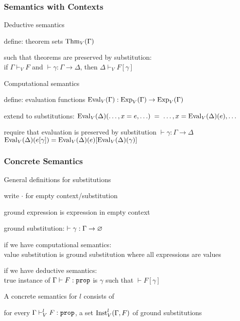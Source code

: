 \begin{frame}\frametitle{Semantics with Contexts}
\begin{blockitems}{Deductive semantics}
\item define: theorem sets $\mathrm{Thm}_V(\Gamma)$
\item such that theorems are preserved by substitution: \\
 if $\Gamma\vdash_V F$ and $\vdash \gamma:\Gamma\to\Delta$, then $\Delta\vdash_V F[\gamma]$
\end{blockitems}

\begin{blockitems}{Computational semantics}
\item define: evaluation functions $\mathrm{Eval}_V(\Gamma):\mathrm{Exp}_V(\Gamma)\to\mathrm{Exp}_V(\Gamma)$
\item extend to substitutions: $\mathrm{Eval}_V(\Delta)(\ldots,x=e,\ldots)\;=\;\ldots,x=\mathrm{Eval}_V(\Delta)(e), \ldots$
\item require that evaluation is preserved by substitution $\vdash \gamma:\Gamma\to\Delta$ \\
  $\mathrm{Eval}_V(\Delta)(e[\gamma])=\mathrm{Eval}_V(\Delta)(e)[\mathrm{Eval}_V(\Delta)(\gamma)]$
\end{blockitems}
\end{frame}

\begin{frame}\frametitle{Concrete Semantics}
\begin{blockitems}{General definitions for substitutions}
\item write $\cdot$ for empty context/substitution
\item ground expression is expression in empty context
\item ground substitution: $\vdash \gamma:\Gamma\to \varnothing$
\item if we have computational semantics: \\ value substitution is ground substitution where all expressions are values
\item if we have deductive semantics: \\
 true instance of $\Gamma\vdash F:\prop$ is $\gamma$ such that $\vdash F[\gamma]$
\end{blockitems}

\begin{blockitems}{A concrete semantics for $l$ consists of}
\item for every $\Gamma\vdash^l_V F:\prop$, a set $\mathrm{Inst}^l_V(\Gamma,F)$ of ground substitutions
\end{blockitems}
\end{frame}

